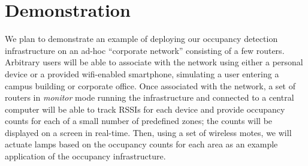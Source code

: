 \section{Demonstration}
We plan to demonstrate an example of deploying our occupancy detection infrastructure on an ad-hoc ``corporate network'' consisting of a few routers. Arbitrary users will be able to associate with the network using either a personal device or a provided wifi-enabled smartphone, simulating a user entering a campus building or corporate office. Once associated with the network, a set of routers in \emph{monitor} mode running the infrastructure and connected to a central computer will be able to track RSSIs for each device and provide occupancy counts for each of a small number of predefined zones; the counts will be displayed on a screen in real-time. Then, using a set of wireless motes, we will actuate lamps based on the occupancy counts for each area as an example application of the occupancy infrastructure.